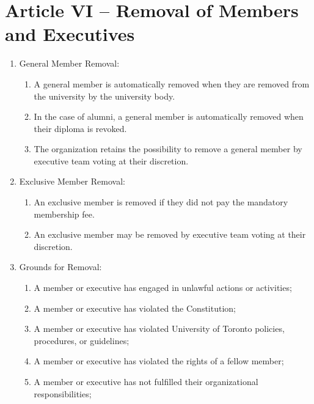 \documentclass[12pt,a4paper]{article}
\begin{document}
\section*{Article VI – Removal of Members and Executives}

\begin{enumerate}
\item General Member Removal:

\begin{enumerate}
\item A general member is automatically removed when they are removed from the university by the university body.

\item In the case of alumni, a general member is automatically removed when their diploma is revoked.

\item The organization retains the possibility to remove a general member by executive team voting at their discretion.
\end{enumerate}

\item Exclusive Member Removal:

\begin{enumerate}
\item An exclusive member is removed if they did not pay the mandatory membership fee.

\item An exclusive member may be removed by executive team voting at their discretion.
\end{enumerate}

\item Grounds for Removal:

\begin{enumerate}
\item A member or executive has engaged in unlawful actions or activities;

\item A member or executive has violated the Constitution;

\item A member or executive has violated University of Toronto policies, procedures, or guidelines;

\item A member or executive has violated the rights of a fellow member;

\item A member or executive has not fulfilled their organizational responsibilities;


\end{enumerate}
\end{enumerate}
\end{document}
